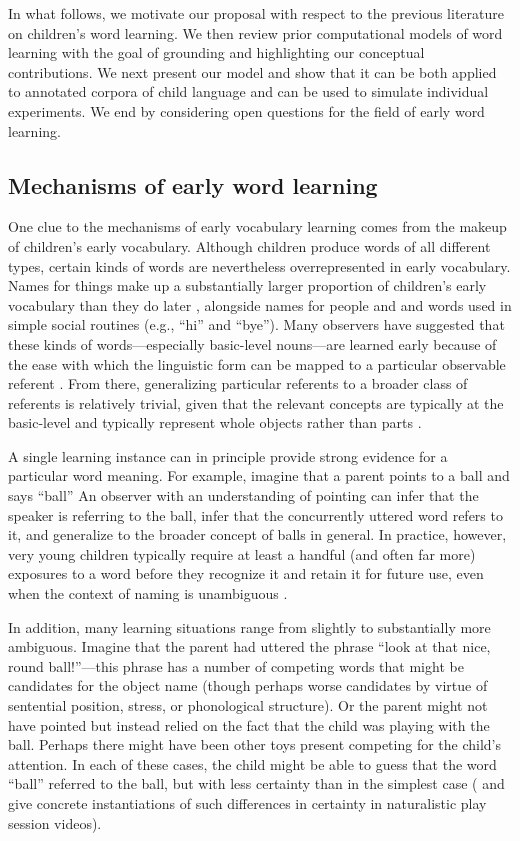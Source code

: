 \documentclass[man,noapacite,12pt]{apa2}
\begin{document}
In what follows, we motivate our proposal with respect to the previous literature on children's word learning. We then review prior computational models of word learning with the goal of grounding and highlighting our conceptual contributions. We next present our model and show that it can be both applied to annotated corpora of child language and can be used to simulate individual experiments. We end by considering open questions for the field of early word learning.

\subsection{Mechanisms of early word learning}

One clue to the mechanisms of early vocabulary learning comes from the makeup of children's early vocabulary. Although children produce words of all different types, certain kinds of words are nevertheless overrepresented in early vocabulary. Names for things make up a substantially larger proportion of children's early vocabulary than they do later \cite{tardif2008,caselli1995}, alongside names for people and and words used in simple social routines (e.g., ``hi'' and ``bye''). Many observers have suggested that these kinds of words---especially basic-level nouns---are learned early because of the ease with which the linguistic form can be mapped to a particular observable referent \cite{locke1700,bloom2002,clark2003}. From there, generalizing particular referents to a broader class of referents is relatively trivial, given that the relevant concepts are typically at the basic-level and typically represent whole objects rather than parts \cite{markman1991}.

A single learning instance can in principle provide strong evidence for a particular word meaning. For example, imagine that a parent points to a ball and says ``ball'' An observer with an understanding of pointing can infer that the speaker is referring to the ball, infer that the concurrently uttered word refers to it, and generalize to the broader concept of balls in general. In practice, however, very young children typically require at least a handful (and often far more) exposures to a word before they recognize it and retain it for future use, even when the context of naming is unambiguous \cite{woodward1994}.

In addition, many learning situations range from slightly to substantially more ambiguous. Imagine that the parent had uttered the phrase ``look at that nice, round ball!''---this phrase has a number of competing words that might be candidates for the object name (though perhaps worse candidates by virtue of sentential position, stress, or phonological structure). Or the parent might not have pointed but instead relied on the fact that the child was playing with the ball. Perhaps there might have been other toys present competing for the child's attention. In each of these cases, the child might be able to guess that the word ``ball'' referred to the ball, but with less certainty than in the simplest case ( and  give concrete instantiations of such differences in certainty in naturalistic play session videos). 
\end{document}
